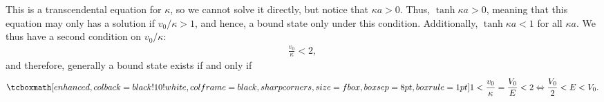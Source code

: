 {This is a transcendental equation for $\kappa$, so we cannot solve it directly, but notice that $\kappa a > 0$.
Thus, $\tanh{\kappa a} > 0$, meaning that this equation may only has a solution if $v_0/\kappa > 1$, and hence, a bound state only under this condition.
Additionally, $\tanh{\kappa a} < 1$ for all $\kappa a$.
We thus have a second condition on $v_0/\kappa$:
\begin{eqnarray}
    \frac{v_0}{\kappa} < 2
,\end{eqnarray}
and therefore, generally a bound state exists if and only if
\begin{eqnarray}
    \eqbox{ 1 < \frac{v_0}{\kappa} = \frac{V_0}{E} < 2 \Leftrightarrow \frac{V_0}{2} < E < V_0 }
.\end{eqnarray}


}


